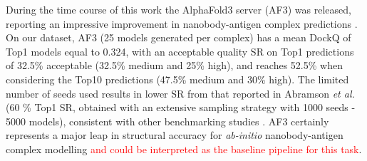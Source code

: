 \documentclass[12pt]{article}
\begin{document}
During the time course of this work the AlphaFold3 server (AF3) was released, reporting an impressive improvement in nanobody-antigen complex predictions \cite{abramson2024accurate}. On our dataset, AF3 (25 models generated per complex) has a mean DockQ of Top1 models equal to 0.324, with an acceptable quality SR on Top1 predictions of 32.5\% acceptable (32.5\% medium and 25\% high), and reaches 52.5\% when considering the Top10 predictions (47.5\% medium and 30\% high). The limited number of seeds used results in lower SR from that reported in Abramson \textit{et al.} \cite{abramson2024accurate} (60 \% Top1 SR, obtained with an extensive sampling strategy with 1000 seeds - 5000 models), consistent with other benchmarking studies \cite{hitawala2024has, eshak2025advancements, Xu2025foldbench}. AF3 certainly represents a major leap in structural accuracy for \textit{ab-initio} nanobody-antigen complex modelling \textcolor{Red}{and could be interpreted as the baseline pipeline for this task}.
\end{document}
